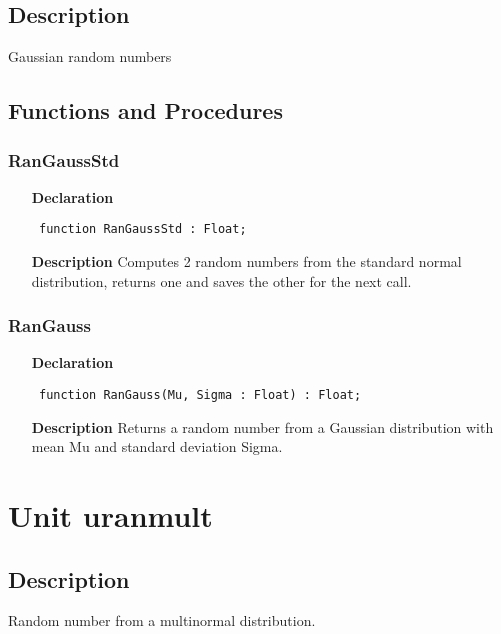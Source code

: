 \documentclass[12pt,a4paper,oneside]{report}
\newcommand{\declarationitem}[1]{\textbf{#1}}
\newcommand{\descriptiontitle}[1]{\textbf{#1}}
\newcommand{\code}[1]{\texttt{#1}}
\begin{document}
\subsection{Description}
Gaussian random numbers
\subsection{Functions and Procedures}
\subsubsection{RanGaussStd}
\label{urangaus-RanGaussStd}
\begin{itemize}\item[\declarationitem{Declaration}\hfill]
	\begin{flushleft}
		\code{
			function RanGaussStd : Float;}
		
	\end{flushleft}
	
	\par
	\item[\descriptiontitle{Description}]
	Computes 2 random numbers from the standard normal distribution, returns one and saves the other for the next call.
	
\end{itemize}
\subsubsection{RanGauss}
\label{urangaus-RanGauss}
\begin{itemize}\item[\declarationitem{Declaration}\hfill]
	\begin{flushleft}
		\code{
			function RanGauss(Mu, Sigma : Float) : Float;}
		
	\end{flushleft}
	
	\par
	\item[\descriptiontitle{Description}]
	Returns a random number from a Gaussian distribution with mean Mu and standard deviation Sigma.
	
\end{itemize}

\section{Unit uranmult}
\label{uranmult}
\subsection{Description} Random number from a multinormal distribution.
\end{document}
